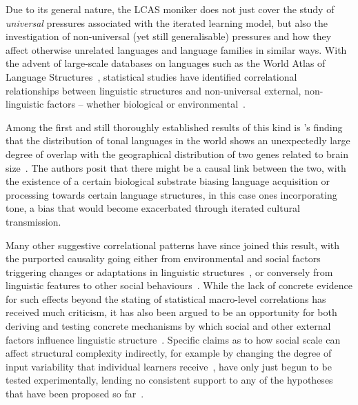 Due to its general nature, the LCAS moniker does not just cover the study of \emph{universal} pressures associated with the iterated learning model, but also the investigation of non-universal (yet still generalisable) pressures and how they affect otherwise unrelated languages and language families in similar ways.
With the advent of large-scale databases on languages such as the World Atlas of Language Structures~\citep{WALS2013}, statistical studies have identified correlational relationships between linguistic structures and non-universal external, non-linguistic factors -- whether biological or environmental~\citep{Ladd2015}.

Among the first and still thoroughly established results of this kind is \citeauthor{Dediu2007}'s finding that the distribution of tonal languages in the world shows an unexpectedly large degree of overlap with the geographical distribution of two genes related to brain size~\citep{Dediu2007}. The authors posit that there might be a causal link between the two, with the existence of a certain biological substrate biasing language acquisition or processing towards certain language structures, in this case ones incorporating tone, a bias that would become exacerbated through iterated cultural transmission.

Many other suggestive correlational patterns have since joined this result, with the purported causality going either from environmental and social factors triggering changes or adaptations in linguistic structures~\citep{Hay2007,Lupyan2010}, or conversely from linguistic features to other social behaviours~\citep{Chen2013}. While the lack of concrete evidence for such effects beyond the stating of statistical macro-level correlations has received much criticism, it has also been argued to be an opportunity for both deriving and testing concrete mechanisms by which social and other external factors influence linguistic structure~\citep{Roberts2012,Nettle2012,Roberts2013correlation}. Specific claims as to how social scale can affect structural complexity indirectly, for example by changing the degree of input variability that individual learners receive~\citep{Wray2007}, have only just begun to be tested experimentally, lending no consistent support to any of the hypotheses that have been proposed so far~\citep{Atkinson2015,Atkinson2016}.

